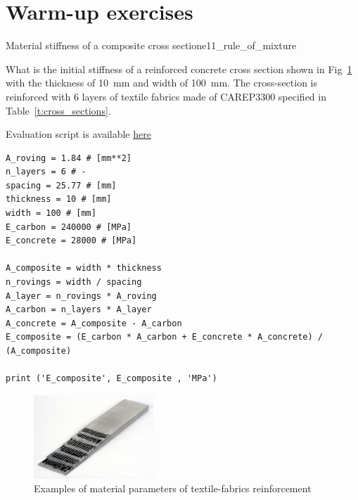 \documentclass[main.tex]{subfiles}
\begin{document}
\section{Warm-up exercises}

\begin{bmcsex}{Material stiffness of a composite  cross section}{e11_rule_of_mixture}

What is the initial stiffness of a reinforced concrete cross section shown in Fig~\ref{FIGCrossSection} with the thickness of 10~mm and width of 100~mm.
The cross-section is reinforced with 6 layers of textile fabrics made of CAREP3300 specified in Table~\ref{t:cross_sections}.

Evaluation script is available \href{https://moodle.rwth-aachen.de/pluginfile.php/263167/mod_folder/content/0/Example%201.1%20-%20Calculate%20the%20elastic%20stiffness%20of%20the%20composite.ipynb?forcedownload=1}{here}

\begin{lstlisting}
A_roving = 1.84 # [mm**2] 
n_layers = 6 # - 
spacing = 25.77 # [mm] 
thickness = 10 # [mm] 
width = 100 # [mm] 
E_carbon = 240000 # [MPa] 
E_concrete = 28000 # [MPa]

A_composite = width * thickness 
n_rovings = width / spacing 
A_layer = n_rovings * A_roving 
A_carbon = n_layers * A_layer 
A_concrete = A_composite - A_carbon 
E_composite = (E_carbon * A_carbon + E_concrete * A_concrete) / (A_composite)

print ('E_composite', E_composite , 'MPa') 
\end{lstlisting}


\end{bmcsex}

\begin{figure}[tb]
	\centering
  \includegraphics[width=0.4\textwidth]{fig/Lecture01/TRC-example.png}
	\caption{Examples of material parameters of textile-fabrics reinforcement}
	\label{FIGCrossSection}
\end{figure}
\end{document}
